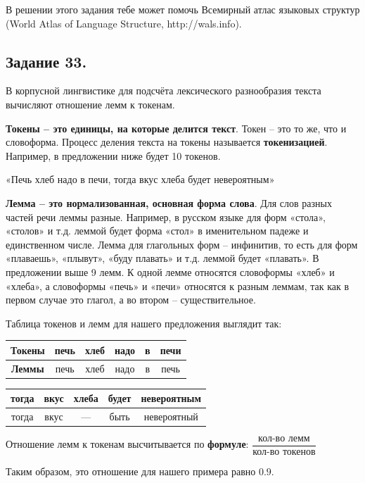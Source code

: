     В решении этого задания тебе может помочь Всемирный атлас языковых структур (World Atlas of Language Structure, http://wals.info).

\subsection*{Задание 33.}
    В корпусной лингвистике для подсчёта лексического разнообразия текста вычисляют отношение лемм к токенам. 
    
    \textbf{Токены – это единицы, на которые делится текст}. Токен – это то же, что и словоформа. Процесс деления текста на токены называется \textbf{токенизацией}. Например, в предложении ниже будет 10 токенов.
    
    «Печь хлеб надо в печи, тогда вкус хлеба будет невероятным»
    
    \textbf{Лемма – это нормализованная, основная форма слова}. Для слов разных частей речи леммы разные. Например, в русском языке для форм «стола», «столов» и т.д. леммой будет форма «стол» в именительном падеже и единственном числе. Лемма для глагольных форм – инфинитив, то есть для форм «плаваешь», «плывут», «буду плавать» и т.д. леммой будет «плавать». В предложении выше 9 лемм. К одной лемме относятся словоформы «хлеб» и «хлеба», а словоформы «печь» и «печи» относятся к разным леммам, так как в первом случае это глагол, а во втором – существительное.
    
    Таблица токенов и лемм для нашего предложения выглядит так:
    
    \begin{tabular}{c|c|c|c|c|c}
        \textbf{Токены} & печь & хлеб & надо & в & печи  \\
        \hline
        \textbf{Леммы} & печь & хлеб & надо & в & печь 
    \end{tabular}
    
    \begin{tabular}{c|c|c|c|c}
        тогда & вкус & хлеба & будет & невероятным\\
        \hline
        тогда & вкус & — & быть & невероятный
    \end{tabular}
    
    Отношение лемм к токенам высчитывается по \textbf{формуле}: $\dfrac{\text{кол-во лемм}}{\text{кол-во токенов}}$
    
    Таким образом, это отношение для нашего примера равно $0.9$.
    
